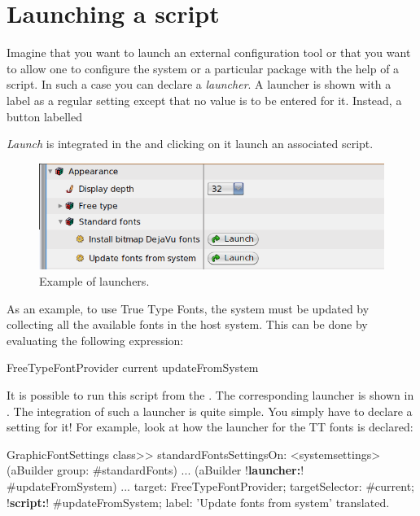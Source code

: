 \documentclass[a4paper,10pt,twoside]{book}
\begin{document}
\section{Launching a script}
Imagine that you want to launch an external configuration tool or that you want to allow one to configure the system or a particular package with the help of a script. In such a case you can declare a \textit{launcher}. A launcher is shown with a label as a regular setting except that no value is to be entered for it. Instead, a button labelled {\textit{Launch} is integrated in the \setbrowser and clicking on it launch an associated script.

\begin{figure}[tbh]
\begin{center}
\includegraphics[scale=0.38]{launcher}
\caption{Example of launchers.}
\end{center}
\end{figure}

As an example, to use True Type Fonts, the system must be updated by collecting all the available fonts in the host system. This can be done by evaluating the following expression:
\begin{code}{}
FreeTypeFontProvider current updateFromSystem
\end{code}
It is  possible to run this script from the \setbrowser. The corresponding launcher is shown in .
The integration of such a launcher is quite simple. You simply have to declare a setting for it! For example, look at how the launcher for the TT fonts is declared:

\begin{code}{}
GraphicFontSettings class>> standardFontsSettingsOn:
	<systemsettings>
	(aBuilder group: #standardFonts)
		...
		(aBuilder !\textbf{launcher:}! #updateFromSystem) ...
				target: FreeTypeFontProvider;
				targetSelector: #current;
				!\textbf{script:}! #updateFromSystem;
				label: 'Update fonts from system' translated.
\end{code}

}
\end{document}
